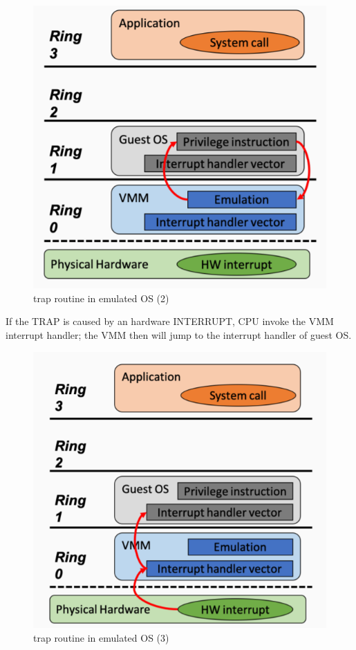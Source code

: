 \begin{figure}[H]
    \centering
    \includegraphics[scale=0.37]{images/trap in emulation (2).png}
    \caption{trap routine in emulated OS (2)}
\end{figure}
If the TRAP is caused by an hardware INTERRUPT, CPU invoke the VMM interrupt handler; the VMM then will jump to the interrupt handler of guest OS.
\begin{figure}[H]
    \centering
    \includegraphics[scale=0.37]{images/trap in emulation (3).png}
    \caption{trap routine in emulated OS (3)}
\end{figure}
